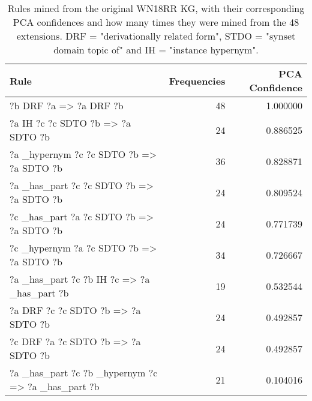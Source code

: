\begin{table}[h]
\begin{tabular}{lrr}
\toprule
                                                                                                      Rule &  Frequencies &  PCA Confidence \\
\midrule
                            ?b  DRF  ?a   => ?a  DRF  ?b &           48 &        1.000000 \\
          ?a  IH  ?c  ?c  SDTO  ?b   => ?a  SDTO  ?b &           24 &        0.886525 \\
                   ?a  \_hypernym  ?c  ?c  SDTO  ?b   => ?a  SDTO  ?b &           36 &        0.828871 \\
                   ?a  \_has\_part  ?c  ?c  SDTO  ?b   => ?a  SDTO  ?b &           24 &        0.809524 \\
                   ?c  \_has\_part  ?a  ?c  SDTO  ?b   => ?a  SDTO  ?b &           24 &        0.771739 \\
                   ?c  \_hypernym  ?a  ?c  SDTO  ?b   => ?a  SDTO  ?b &           34 &        0.726667 \\
                                      ?a  \_has\_part  ?c  ?b  IH  ?c   => ?a  \_has\_part  ?b &           19 &        0.532544 \\
?a  DRF  ?c  ?c  SDTO  ?b   => ?a  SDTO  ?b &           24 &        0.492857 \\
?c  DRF  ?a  ?c  SDTO  ?b   => ?a  SDTO  ?b &           24 &        0.492857 \\
                                               ?a  \_has\_part  ?c  ?b  \_hypernym  ?c   => ?a  \_has\_part  ?b &           21 &        0.104016 \\
\bottomrule
\end{tabular}
\caption{Rules mined from the original WN18RR KG, with their corresponding PCA confidences and how many times they were mined from the 48 extensions. DRF = "derivationally related form", STDO = "synset domain topic of" and IH = "instance hypernym".}
\label{wn18rr_original_rules_table_PCA}
\end{table}

